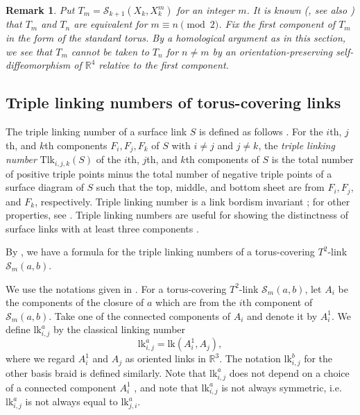 \documentclass[a4paper,11pt]{amsart}
\numberwithin{equation}{section}
\newtheorem{remark}[theorem]{Remark}
\newenvironment{rem}{\begin{remark}\rm}{\end{remark}}
\begin{document}
\begin{rem}
Put $T_m=\mathcal{S}_{k+1}(X_k, X_k^m)$ for an integer $m$. It is known (\cite{Boyle}, see also \cite{Iwase, N1}) that $T_m$ and $T_n$ are equivalent for $m \equiv n \pmod{2}$. Fix the first component of $T_m$ in the form of the standard torus. By a homological argument as in this section, we see that $T_{m}$ cannot be taken to $T_{n}$ for $n \neq m$ by an orientation-preserving self-diffeomorphism of $\mathbb{R}^4$ relative to the first component.
\end{rem}

\subsection{Triple linking numbers of torus-covering links}\label{sec:5-2}

The triple linking number of a surface link $S$ is defined as follows \cite[Definition 9.1]{CJKLS}. 
For the $i$th, $j$th, and $k$th components $F_i, F_j,F_k$ of $S$ with $i \neq j$ and $j \neq k$, the {\it triple linking number} $\mathrm{Tlk}_{i,j,k}(S)$ of the $i$th, $j$th, and $k$th components of $S$ is the total number of positive triple points minus the total number of negative triple points of a surface diagram of $S$ such that the top, middle, and bottom sheet are from $F_i, F_j$, and $F_k$, respectively. Triple linking number is a link bordism invariant \cite{CKS, CKSS01,San, San2}; for other properties, see \cite{CJKLS, CKS}. Triple linking numbers are useful for showing the distinctness of surface links with at least three components \cite{I-N, N2, N3}.

By \cite{I-N}, we have a formula for the triple linking numbers of a torus-covering $T^2$-link $\mathcal{S}_{m}(a,b)$.

We use the notations given in \cite{I-N}. 
For a torus-covering $T^2$-link $\mathcal{S}_{m}(a,b)$, let ${A}_{i}$ be the components of the closure of $a$ which are from the $i$th component of $\mathcal{S}_{m}(a,b)$. Take one of the connected components of ${A}_{i}$ and denote it by $A^1_{i}$. 
We define $\mathrm{lk}^{a}_{i,j}$ by the classical linking number
\[ \mathrm{lk}_{i,j}^{a} = \mathrm{lk} ( A_{i}^1, {A}_{j}), \]
where we regard ${A}_{i}^1$ and $A_j$ as oriented links in $\mathbb{R}^{3}$. The notation $\mathrm{lk}^{b}_{i,j}$ for the other basis braid is defined similarly.
Note that $\mathrm{lk}^{a}_{i,j}$ does not depend on a choice of a connected component $A_{i}^1$ \cite[Remark 5.5]{I-N}, and note that $\mathrm{lk}^{a}_{i,j}$ is not always symmetric, i.e. $\mathrm{lk}^{a}_{i,j}$ is not always equal to $\mathrm{lk}^{a}_{j,i}$.
\end{document}
